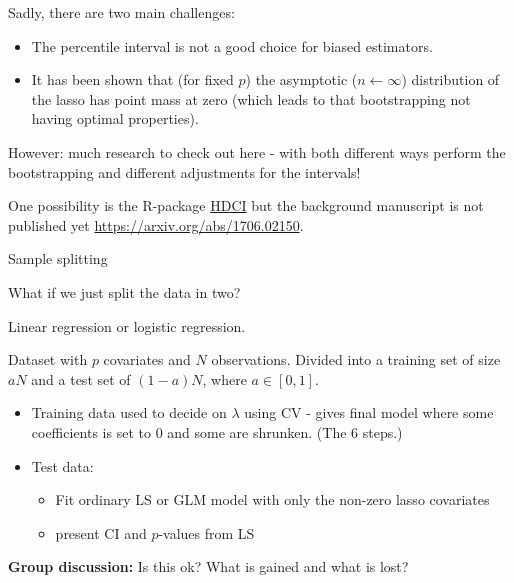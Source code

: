 \documentclass[
  ignorenonframetext,
]{beamer}
\providecommand{\tightlist}{%
  \setlength{\itemsep}{0pt}\setlength{\parskip}{0pt}}
\begin{document}
\begin{frame}

Sadly, there are two main challenges:

\begin{itemize}
\tightlist
\item
  The percentile interval is not a good choice for biased estimators.
\item
  It has been shown that (for fixed \(p\)) the asymptotic
  (\(n\leftarrow \infty\)) distribution of the lasso has point mass at
  zero (which leads to that bootstrapping not having optimal
  properties).
\end{itemize}

However: much research to check out here - with both different ways
perform the bootstrapping and different adjustments for the intervals!

One possibility is the R-package
\href{https://cran.r-project.org/web/packages/HDCI/HDCI.pdf}{HDCI} but
the background manuscript is not published yet
\url{https://arxiv.org/abs/1706.02150}.

\end{frame}

\begin{frame}{Sample splitting}
\protect\hypertarget{sample-splitting}{}

\begin{block}{What if we just split the data in two?}

Linear regression or logistic regression.

Dataset with \(p\) covariates and \(N\) observations. Divided into a
training set of size \(aN\) and a test set of \((1-a)N\), where
\(a \in [0,1]\).

\begin{itemize}
\item
  Training data used to decide on \(\lambda\) using CV - gives final
  model where some coefficients is set to 0 and some are shrunken. (The
  6 steps.)
\item
  Test data:

  \begin{itemize}
  \tightlist
  \item
    Fit ordinary LS or GLM model with only the non-zero lasso covariates
  \item
    present CI and \(p\)-values from LS
  \end{itemize}
\end{itemize}

\textbf{Group discussion:} Is this ok? What is gained and what is lost?

\end{block}

\end{frame}
\end{document}
